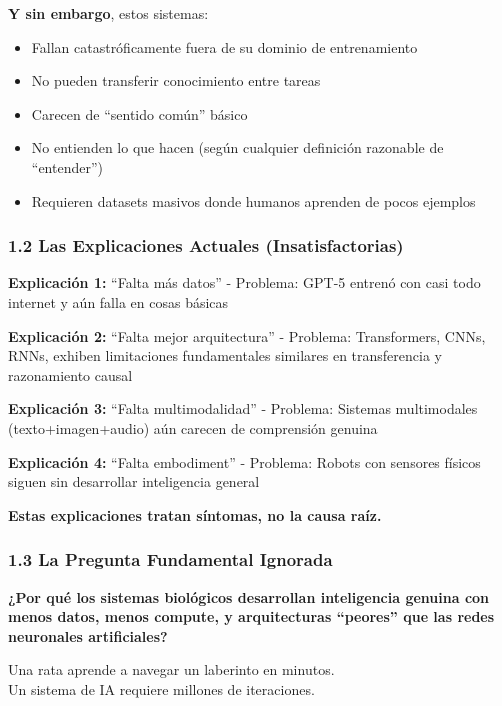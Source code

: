 \textbf{Y sin embargo}, estos sistemas:

\begin{itemize}
\tightlist
\item
  Fallan catastróficamente fuera de su dominio de entrenamiento
\item
  No pueden transferir conocimiento entre tareas
\item
  Carecen de ``sentido común'' básico
\item
  No entienden lo que hacen (según cualquier definición razonable de
  ``entender'')
\item
  Requieren datasets masivos donde humanos aprenden de pocos ejemplos
\end{itemize}

\subsubsection{1.2 Las Explicaciones Actuales
(Insatisfactorias)}\label{las-explicaciones-actuales-insatisfactorias}

\textbf{Explicación 1:} ``Falta más datos'' - Problema: GPT-5 entrenó
con casi todo internet y aún falla en cosas básicas

\textbf{Explicación 2:} ``Falta mejor arquitectura'' - Problema:
Transformers, CNNs, RNNs, exhiben limitaciones fundamentales similares
en transferencia y razonamiento causal

\textbf{Explicación 3:} ``Falta multimodalidad'' - Problema: Sistemas
multimodales (texto+imagen+audio) aún carecen de comprensión genuina

\textbf{Explicación 4:} ``Falta embodiment'' - Problema: Robots con
sensores físicos siguen sin desarrollar inteligencia general

\textbf{Estas explicaciones tratan síntomas, no la causa raíz.}

\subsubsection{1.3 La Pregunta Fundamental
Ignorada}\label{la-pregunta-fundamental-ignorada}

\textbf{¿Por qué los sistemas biológicos desarrollan inteligencia
genuina con menos datos, menos compute, y arquitecturas ``peores'' que
las redes neuronales artificiales?}

Una rata aprende a navegar un laberinto en minutos.\\
Un sistema de IA requiere millones de iteraciones.

